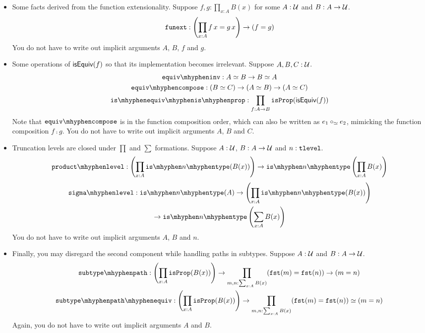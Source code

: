 \documentclass[12pt]{article}
\theoremstyle{plain}
\begin{document}
\begin{itemize}
  \item Some facts derived from the function extensionality.
    Suppose $f, g: \prod_{x:A} B(x)$ for some $A : \mathcal{U}$ and $B : A \to \mathcal{U}$.
    \[
      \mathtt{funext} : \left(\prod_{x:A} f\,x = g\,x \right) \to (f = g)
    \]
    You do not have to write out implicit arguments $A$, $B$, $f$ and $g$.
  \item Some operations of $\mathsf{isEquiv}(f)$ so that its implementation becomes irrelevant.
    Suppose $A, B, C : \mathcal{U}$.
    \begin{gather*}
      \equivinv : A \eqv B \to B \eqv A
      \\
      \equivcompose : (B \eqv C) \to (A \eqv B) \to (A \eqv C)
      \\
      \isequivisprop : \prod_{f:A\to B}\isprop(\isequiv(f))
    \end{gather*}
    Note that $\equivcompose$ is in the function composition order,
    which can also be written as $e_1 \mathbin{\mathbin{\circ}_\simeq} e_2$,
    mimicking the function composition $f \comp g$.
    You do not have to write out implicit arguments $A$, $B$ and $C$.
  \item Truncation levels are closed under $\prod$ and $\sum$ formations.
    Suppose $A : \mathcal{U}$, $B : A \to \mathcal{U}$ and $n : \mathtt{tlevel}$.
    \[
      \productlevel :
      \left(\prod_{x:A}\istype{n}(B(x))\right) \to \istype{n}\left(\prod_{x:A}B(x)\right)
    \]
    \begin{multline*}
      \sigmalevel :
      \istype{n}(A)
      \to
      \left(\prod_{x:A}\istype{n}(B(x))\right)
      \\
      \to
      \istype{n}\left(\sum_{x:A}B(x)\right)
    \end{multline*}
    You do not have to write out implicit arguments $A$, $B$ and $n$.
  \item Finally, you may disregard the second component while handling paths in subtypes.
    Suppose $A : \mathcal{U}$ and $B : A \to \mathcal{U}$.
    \begin{gather*}
      \subtypepath :
      \left(\prod_{x{:}A} \isprop(B(x))\right)
      \to
      \prod_{m,n:\sum_{x:A}B(x)}
      (\fst(m)=\fst(n))
      \to
      (m = n)
      \\
      \subtypepatheqiv :
      \left(\prod_{x{:}A} \isprop(B(x))\right)
      \to
      \prod_{m,n:\sum_{x:A}B(x)}
      (\fst(m)=\fst(n))
      \eqv
      (m = n)
    \end{gather*}
    Again, you do not have to write out implicit arguments $A$ and $B$.
\end{itemize}
\end{document}
